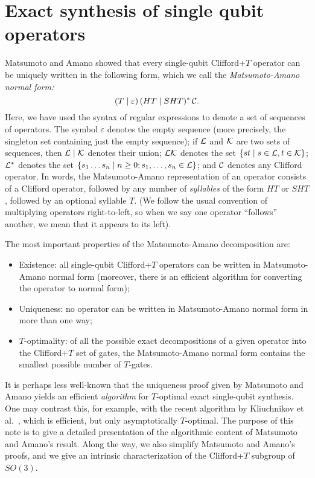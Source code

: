 

\section{Exact synthesis of single qubit operators} %
\label{sec:exact_synthesis_of_single_qubit_operators}


Matsumoto and Amano {\cite{MA08}} showed that every single-qubit Clifford+$T$ operator can be
uniquely written in the following form, which we call the {\em Matsumoto-Amano normal form:}
\begin{equation}\label{eqn-ma}
 (T\mid\varepsilon)\,(HT\mid SHT)^*\,{{\mathcal C}}.
\end{equation}
Here, we have used the syntax of regular expressions {\cite{regexp}} to denote a set of sequences
of operators. The symbol $\varepsilon$ denotes the empty sequence (more precisely, the singleton
set containing just the empty sequence); if ${\mathcal L}$ and ${\mathcal K}$ are two sets of sequences, then
${\mathcal L}\mid {\mathcal K}$ denotes their union; ${\mathcal L} {\mathcal K}$ denotes the set $\{st\mid s\in{\mathcal L}, t\in{\mathcal K}\}$; ${\mathcal L}^*$
denotes the set $\{s_1\ldots s_n \mid n\geq 0; s_1,\ldots,s_n\in{\mathcal L}\}$; and ${\mathcal C}$ denotes any
Clifford operator. In words, the Matsumoto-Amano representation of an operator consists of a
Clifford operator, followed by any number of {\em syllables} of the form $HT$ or $SHT$, followed by
an optional syllable $T$. (We follow the usual convention of multiplying operators right-to-left,
so when we say one operator ``follows'' another, we mean that it appears to its left).

The most important properties of the Matsumoto-Amano decomposition are:
\begin{itemize}
  \item Existence: all single-qubit Clifford+$T$ operators can be written in Matsumoto-Amano
    normal form (moreover, there is an efficient algorithm for converting the operator to normal
    form);

  \item Uniqueness: no operator can be written in Matsumoto-Amano normal form in more than one way;

  \item $T$-optimality: of all the possible exact decompositions of a given operator into the
    Clifford+$T$ set of gates, the Matsumoto-Amano normal form contains the smallest possible number
    of $T$-gates.
\end{itemize}
It is perhaps less well-known that the uniqueness proof given by Matsumoto and Amano yields an
efficient {\em algorithm} for $T$-optimal exact single-qubit synthesis. One may contrast this, for
example, with the recent algorithm by Kliuchnikov et al.~{\cite{Kliuchnikov-et-al}}, which is
efficient, but only asymptotically $T$-optimal. The purpose of this note is to give a detailed
presentation of the algorithmic content of Matsumoto and Amano's result. Along the way, we also
simplify Matsumoto and Amano's proofs, and we give an intrinsic characterization of the
Clifford+$T$ subgroup of $SO(3)$.

